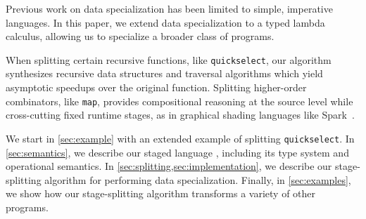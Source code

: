 Previous work on data specialization has been limited to simple, imperative
languages. In this paper, we extend data specialization to a typed lambda
calculus, allowing us to specialize a broader class of programs.

When splitting certain recursive functions, like \texttt{quickselect}, our
algorithm synthesizes recursive data structures and traversal algorithms which
yield asymptotic speedups over the original function. Splitting higher-order
combinators, like \texttt{map}, provides compositional reasoning at the source
level while cross-cutting fixed runtime stages, as in graphical shading
languages like Spark~\cite{Foley:2011}.

We start in \ref{sec:example} with an extended example of splitting
\texttt{quickselect}.
In \ref{sec:semantics}, we describe our staged language \lang, including its
type system and operational semantics.
In \ref{sec:splitting,sec:implementation}, we describe our stage-splitting
algorithm for performing data specialization.
Finally, in \ref{sec:examples}, we show how our stage-splitting algorithm
transforms a variety of other programs.
